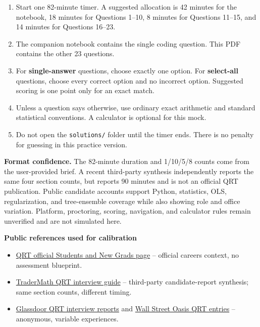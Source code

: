 \documentclass[10pt,a4paper]{article}
\begin{document}
\begin{enumerate}[label=\arabic*.,leftmargin=7mm,itemsep=3pt]
  \item Start one 82-minute timer. A suggested allocation is 42 minutes for the notebook, 18 minutes for Questions 1--10, 8 minutes for Questions 11--15, and 14 minutes for Questions 16--23.
  \item The companion notebook contains the single coding question. This PDF contains the other 23 questions.
  \item For \textbf{single-answer} questions, choose exactly one option. For \textbf{select-all} questions, choose every correct option and no incorrect option. Suggested scoring is one point only for an exact match.
  \item Unless a question says otherwise, use ordinary exact arithmetic and standard statistical conventions. A calculator is optional for this mock.
  \item Do not open the \texttt{solutions/} folder until the timer ends. There is no penalty for guessing in this practice version.
\end{enumerate}

\vspace{4mm}
\begin{notebox}
\textbf{Format confidence.} The 82-minute duration and 1/10/5/8 counts come from the user-provided brief. A recent third-party synthesis independently reports the same four section counts, but reports 90 minutes and is not an official QRT publication. Public candidate accounts support Python, statistics, OLS, regularization, and tree-ensemble coverage while also showing role and office variation. Platform, proctoring, scoring, navigation, and calculator rules remain unverified and are not simulated here.
\end{notebox}

\vspace{5mm}
\textbf{Public references used for calibration}

\begin{itemize}[leftmargin=6mm,itemsep=2pt]
  \item \href{https://www.qube-rt.com/careers/research-and-trading/london/students-and-new-graduates/}{QRT official Students and New Grads page} -- official careers context, no assessment blueprint.
  \item \href{https://www.tradermath.org/articles/qube-research-technologies-interview-guide}{TraderMath QRT interview guide} -- third-party candidate-report synthesis; same section counts, different timing.
  \item \href{https://www.glassdoor.com/Interview/Qube-Research-and-Technologies-Interview-Questions-E3226090.htm}{Glassdoor QRT interview reports} and \href{https://www.wallstreetoasis.com/company/qube-research-and-technologies/interview}{Wall Street Oasis QRT entries} -- anonymous, variable experiences.
\end{itemize}
\end{document}
